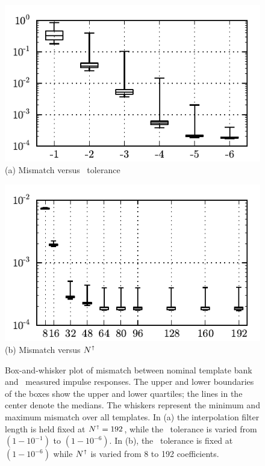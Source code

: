 \begin{figure}[b]
	\begin{minipage}[t]{0.5\textwidth}
		\begin{center}
			\includegraphics{figures/bw.pdf}
			(a) Mismatch versus \SVD\ tolerance
		\end{center}
	\end{minipage}
	\begin{minipage}[t]{0.5\textwidth}
		\begin{center}
			\includegraphics{figures/bw_resample.pdf}
			(b) Mismatch versus $N^\shortuparrow$
		\end{center}
	\end{minipage}
	\caption{\label{fig:bw}Box-and-whisker plot of mismatch between nominal
template bank and \lloid\ measured impulse responses.  The upper and lower boundaries of
the boxes show the upper and lower quartiles; the lines in the center denote the medians.
The whiskers represent the minimum and maximum mismatch over all templates.  In 
(a) the interpolation filter length is held fixed at $N^\shortuparrow = 192$, while
the \SVD\ tolerance is varied from $\left(1-10^{-1}\right)$ to $\left(1-10^{-6}\right)$.
In (b), the \SVD\ tolerance is fixed at $\left(1-10^{-6}\right)$ while $N^\shortuparrow$
is varied from 8 to 192 coefficients.}
\end{figure}

